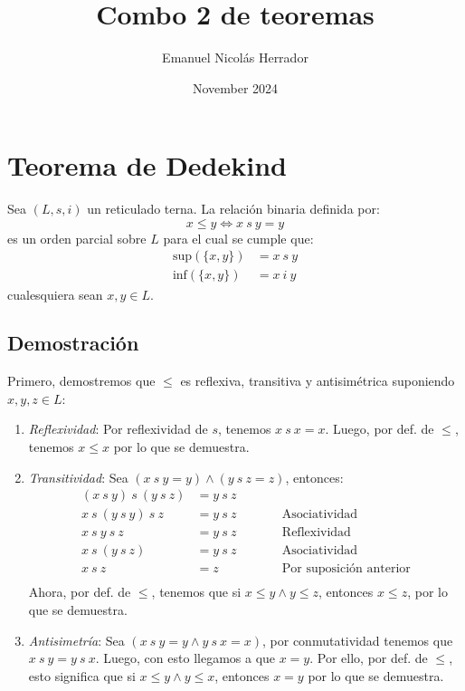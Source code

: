 \documentclass{article}
\title{Combo 2 de teoremas}
\author{Emanuel Nicolás Herrador}
\date{November 2024}
\begin{document}
\maketitle

\section*{Teorema de Dedekind}
Sea $(L,s,i)$ un reticulado terna. La relación binaria definida por:
\begin{equation*}
  x\leq y\iff x\ s\ y=y
\end{equation*}
es un orden parcial sobre $L$ para el cual se cumple que:
\begin{equation*}
  \begin{aligned}
    \text{sup}(\{x,y\}) & =x\ s\ y \\
    \text{inf}(\{x,y\}) & =x\ i\ y
  \end{aligned}
\end{equation*}
cualesquiera sean $x,y\in L$.
\subsection*{Demostración}
Primero, demostremos que $\leq$ es reflexiva, transitiva y antisimétrica suponiendo $x,y,z\in L$:
\begin{enumerate}
  \item \textit{Reflexividad}: Por reflexividad de $s$, tenemos $x\ s\ x = x$. Luego, por def. de $\leq$, tenemos $x\leq x$ por lo que se demuestra.
  \item \textit{Transitividad}: Sea $(x\ s\ y=y)\land (y\ s\ z=z)$, entonces:
        \begin{equation*}
          \begin{alignedat}{2}
            (x\ s\ y)\ s\ (y\ s\ z) & = y\ s\ z &  &                                      \\
            x\ s\ (y\ s\ y)\ s\ z   & = y\ s\ z &  & \qquad\text{Asociatividad}           \\
            x\ s\ y\ s\ z           & = y\ s\ z &  & \qquad\text{Reflexividad}            \\
            x\ s\ (y\ s\ z)         & = y\ s\ z &  & \qquad\text{Asociatividad}           \\
            x\ s\ z                 & = z       &  & \qquad\text{Por suposición anterior} \\
          \end{alignedat}
        \end{equation*}
        Ahora, por def. de $\leq$, tenemos que si $x\leq y\land y\leq z$, entonces $x\leq z$, por lo que se demuestra.
  \item \textit{Antisimetría}: Sea $(x\ s\ y=y\land y\ s\ x=x)$, por conmutatividad tenemos que $x\ s\ y=y\ s\ x$. Luego, con esto llegamos a que $x=y$. Por ello, por def. de $\leq$, esto significa que si $x\leq y\land y\leq x$, entonces $x=y$ por lo que se demuestra.
\end{enumerate}
\end{document}
